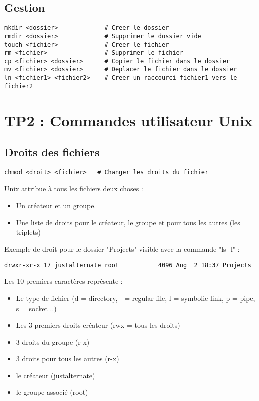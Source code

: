 \documentclass{article}
\begin{document}
\subsection{Gestion}
\begin{lstlisting}
mkdir <dossier>             # Creer le dossier
rmdir <dossier>             # Supprimer le dossier vide
touch <fichier>             # Creer le fichier
rm <fichier>                # Supprimer le fichier
cp <fichier> <dossier>      # Copier le fichier dans le dossier
mv <fichier> <dossier>      # Deplacer le fichier dans le dossier
ln <fichier1> <fichier2>    # Creer un raccourci fichier1 vers le fichier2 
\end{lstlisting}

\section{TP2 : Commandes utilisateur Unix}

\subsection{Droits des fichiers}

\begin{lstlisting}
chmod <droit> <fichier>   # Changer les droits du fichier
\end{lstlisting}

Unix attribue à tous les fichiers deux choses :

\begin{itemize}
  \item Un créateur et un groupe.
  \item Une liste de droits pour le créateur, le groupe et pour tous les autres (les triplets)
\end{itemize}

Exemple de droit pour le dossier "Projects" visible avec la commande "ls -l" : 
\begin{lstlisting}
drwxr-xr-x 17 justalternate root           4096 Aug  2 18:37 Projects
\end{lstlisting}
Les 10 premiers caractères représente :
\begin{itemize}
  \item Le type de fichier (d = directory, - = regular file, l = symbolic link, p = pipe, s = socket ..)
  \item Les 3 premiers droits créateur (rwx = tous les droits)
  \item 3 droits du groupe (r-x)
  \item 3 droits pour tous les autres (r-x)
  \item le créateur (justalternate)
  \item le groupe associé (root)
\end{itemize}
\end{document}
